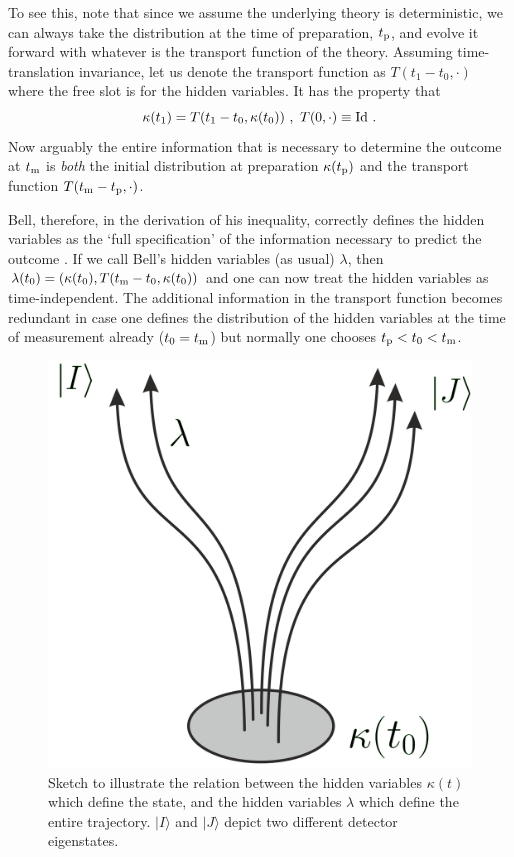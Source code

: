 \documentclass[superscriptaddress,floatfix,nofootinbib,12pt]{revtex4-2}
\begin{document}
To see this, note that since we assume the underlying theory is deterministic, we can always take the distribution at the time of preparation, $t_{\rm p}$, and evolve it forward with whatever is the transport function of the theory. Assuming time-translation invariance, let us denote the transport function as $T(t_1-t_0,\cdot)$ where the free slot is for the hidden variables. It has the property that
\begin{equation}
\kappa(t_1) = T(t_1-t_0,\kappa(t_0))~,~T(0,\cdot) \equiv {\rm Id}~.
\end{equation}
Now arguably the entire information that is necessary to determine the outcome at $t_{\rm m}$ is \emph{both} the initial distribution at preparation $\kappa(t_{\rm p})$ and the transport function $T(t_{\rm m}-t_{\rm p},\cdot)$.

Bell, therefore, in the derivation of his inequality, correctly defines the hidden variables as the `full specification' of the information necessary to predict the outcome \cite{Bell2004Speakable}. If we call Bell's hidden variables (as usual) $\lambda$, then $\lambda(t_0) = (\kappa (t_0),T(t_{\rm m}-t_0,\kappa(t_0))$ and one can now treat the hidden variables as time-independent. The additional information in the transport function becomes redundant in case one defines the distribution of the hidden variables at the time of measurement already ($t_0 = t_{\rm m}$) but normally one chooses $t_{\rm p}<t_0<t_{\rm m}$. 

\begin{figure}
    \centering
    \includegraphics[width=0.7\linewidth]{kappalambda.png}
    \caption{Sketch to illustrate the relation between the hidden variables $\kappa(t)$ which define the state, and the hidden variables $\lambda$ which define the entire trajectory. $|I \rangle$ and $|J\rangle$ depict two different detector eigenstates.}
    \label{fig:kappalambda}
\end{figure}
\end{document}
